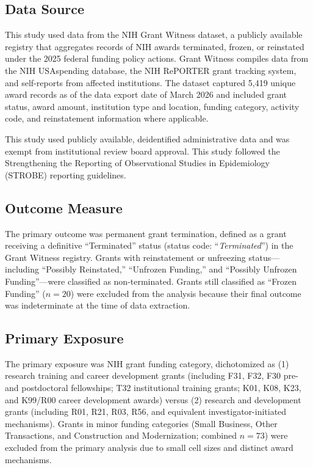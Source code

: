 \documentclass[10pt, letterpaper]{article}
\begin{document}
\subsection*{Data Source}

This study used data from the NIH Grant Witness dataset,\cite{GrantWitness2025} a publicly available registry that aggregates records of NIH awards terminated, frozen, or reinstated under the 2025 federal funding policy actions. Grant Witness compiles data from the NIH USAspending database, the NIH RePORTER grant tracking system,\cite{NIHReporter2025} and self-reports from affected institutions. The dataset captured 5,419 unique award records as of the data export date of March 2026 and included grant status, award amount, institution type and location, funding category, activity code, and reinstatement information where applicable.

This study used publicly available, deidentified administrative data and was exempt from institutional review board approval. This study followed the Strengthening the Reporting of Observational Studies in Epidemiology (STROBE) reporting guidelines.\cite{VonElm2007}

\subsection*{Outcome Measure}

The primary outcome was permanent grant termination, defined as a grant receiving a definitive ``Terminated'' status (status code: ``\textit{Terminated}'') in the Grant Witness registry. Grants with reinstatement or unfreezing status---including ``Possibly Reinstated,'' ``Unfrozen Funding,'' and ``Possibly Unfrozen Funding''---were classified as non-terminated. Grants still classified as ``Frozen Funding'' ($n = 20$) were excluded from the analysis because their final outcome was indeterminate at the time of data extraction.

\subsection*{Primary Exposure}

The primary exposure was NIH grant funding category, dichotomized as (1) research training and career development grants (including F31, F32, F30 pre- and postdoctoral fellowships; T32 institutional training grants; K01, K08, K23, and K99/R00 career development awards) versus (2) research and development grants (including R01, R21, R03, R56, and equivalent investigator-initiated mechanisms). Grants in minor funding categories (Small Business, Other Transactions, and Construction and Modernization; combined $n = 73$) were excluded from the primary analysis due to small cell sizes and distinct award mechanisms.
\end{document}
